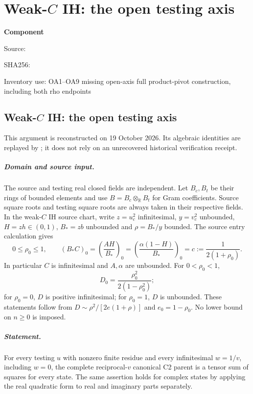 \chapter{Weak-$C$ IH: the open testing axis}
\label{component:pf95b1c5fc32f}
\noindent\textbf{Component }\par
{\small\noindent Source: \par}
{\small\noindent SHA256: \par}
{\small\noindent Inventory use: OA1--OA9 missing open-axis full product-pivot construction, including both rho endpoints\par}
\medskip
\section{Weak-$C$ IH: the open testing axis}
\label{pf95b1c5fc32f:sec:weak-ih-open-axis}
This argument is reconstructed on 19 October 2026.  Its algebraic identities
are replayed by ; it does not rely on an
unrecovered historical verification receipt.

\paragraph{Domain and source input.}
The source and testing real closed fields are independent.  Let $B_c,B_t$
be their rings of bounded elements and use $B=B_c\otimes_{\mathbb R}B_t$
for Gram coefficients.  Source square roots and testing square roots are
always taken in their respective fields.  In the weak-$C$ IH source chart,
write $z=u_c^2$ infinitesimal, $y=v_c^2$ unbounded,
$H=zh\in(0,1)$, $B_*=zb$ unbounded and $\rho=B_*/y$ bounded.
The source entry calculation gives
\[
 0\leq\rho_0\leq1,\qquad
 (B_*C)_0=\left(\frac{AH}{B_*}\right)_0
 =\left(\frac{\alpha(1-H)}{B_*}\right)_0
 =c:=\frac1{2(1+\rho_0)}.
\tag{OA1}
\]
In particular $C$ is infinitesimal and $A,\alpha$ are unbounded.
For $0<\rho_0<1$,
\[
 D_0=\frac{\rho_0^2}{2(1-\rho_0^2)};
\tag{OA2}
\]
for $\rho_0=0$, $D$ is positive infinitesimal; for $\rho_0=1$, $D$ is
unbounded.  These statements follow from
$D\sim\rho^2/[2e(1+\rho)]$ and $e_0=1-\rho_0$.
No lower bound on $n\geq0$ is imposed.

\paragraph{Statement.}
For every testing $u$ with nonzero finite residue and every infinitesimal
$w=1/v$, including $w=0$, the complete reciprocal-$v$ canonical C2 parent
is a tensor sum of squares for every state.  The same assertion holds for
complex states by applying the real quadratic form to real and imaginary
parts separately.

